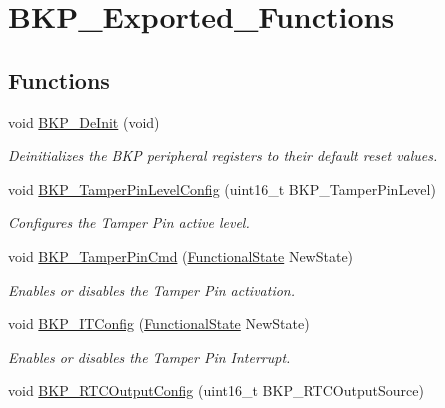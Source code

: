 \hypertarget{group___b_k_p___exported___functions}{}\section{B\+K\+P\+\_\+\+Exported\+\_\+\+Functions}
\label{group___b_k_p___exported___functions}
\subsection*{Functions}
\begin{DoxyCompactItemize}
\item 
void \mbox{\hyperlink{group___b_k_p___exported___functions_gaabff4d8f5ebf4fd9a840bcc9042ca226}{B\+K\+P\+\_\+\+De\+Init}} (void)
\begin{DoxyCompactList}\small\item\em Deinitializes the B\+KP peripheral registers to their default reset values. \end{DoxyCompactList}\item 
void \mbox{\hyperlink{group___b_k_p___exported___functions_gae216446d641d075fb575ce6dbe2ff4c1}{B\+K\+P\+\_\+\+Tamper\+Pin\+Level\+Config}} (uint16\+\_\+t B\+K\+P\+\_\+\+Tamper\+Pin\+Level)
\begin{DoxyCompactList}\small\item\em Configures the Tamper Pin active level. \end{DoxyCompactList}\item 
void \mbox{\hyperlink{group___b_k_p___exported___functions_ga3a0cdff9ad8238ade2c67e2b70f530ac}{B\+K\+P\+\_\+\+Tamper\+Pin\+Cmd}} (\mbox{\hyperlink{group___exported__types_gac9a7e9a35d2513ec15c3b537aaa4fba1}{Functional\+State}} New\+State)
\begin{DoxyCompactList}\small\item\em Enables or disables the Tamper Pin activation. \end{DoxyCompactList}\item 
void \mbox{\hyperlink{group___b_k_p___exported___functions_gab8dbd0c4773f6edb98a28c8ff6a2ead0}{B\+K\+P\+\_\+\+I\+T\+Config}} (\mbox{\hyperlink{group___exported__types_gac9a7e9a35d2513ec15c3b537aaa4fba1}{Functional\+State}} New\+State)
\begin{DoxyCompactList}\small\item\em Enables or disables the Tamper Pin Interrupt. \end{DoxyCompactList}\item 
void \mbox{\hyperlink{group___b_k_p___exported___functions_ga3d1b22b3c6a79f7b423616a0af1885bf}{B\+K\+P\+\_\+\+R\+T\+C\+Output\+Config}} (uint16\+\_\+t B\+K\+P\+\_\+\+R\+T\+C\+Output\+Source)

\end{DoxyCompactItemize}
